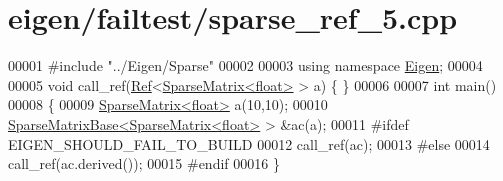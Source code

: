 \hypertarget{eigen_2failtest_2sparse__ref__5_8cpp_source}{}\section{eigen/failtest/sparse\+\_\+ref\+\_\+5.cpp}
\label{eigen_2failtest_2sparse__ref__5_8cpp_source}

\begin{DoxyCode}
00001 \textcolor{preprocessor}{#include "../Eigen/Sparse"}
00002 
00003 \textcolor{keyword}{using namespace }\hyperlink{namespace_eigen}{Eigen};
00004 
00005 \textcolor{keywordtype}{void} call\_ref(\hyperlink{group___core___module_class_eigen_1_1_ref}{Ref}<\hyperlink{group___sparse_core___module_class_eigen_1_1_sparse_matrix}{SparseMatrix<float>} > a) \{ \}
00006 
00007 \textcolor{keywordtype}{int} main()
00008 \{
00009   \hyperlink{group___sparse_core___module_class_eigen_1_1_sparse_matrix}{SparseMatrix<float>} a(10,10);
00010   \hyperlink{group___sparse_core___module_class_eigen_1_1_sparse_matrix_base}{SparseMatrixBase<SparseMatrix<float>} > &ac(a);
00011 \textcolor{preprocessor}{#ifdef EIGEN\_SHOULD\_FAIL\_TO\_BUILD}
00012   call\_ref(ac);
00013 \textcolor{preprocessor}{#else}
00014   call\_ref(ac.derived());
00015 \textcolor{preprocessor}{#endif}
00016 \}
\end{DoxyCode}
